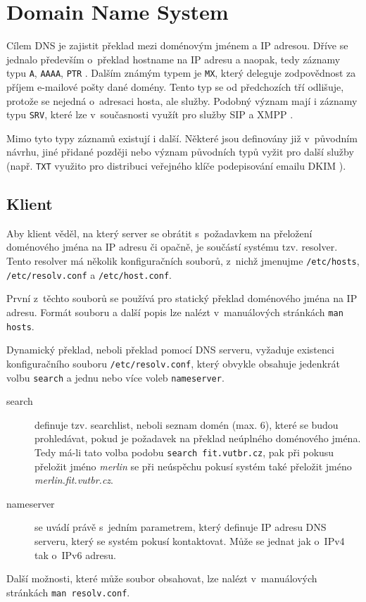 \section{Domain Name System}
\label{dns}
Cílem DNS je zajistit překlad mezi doménovým jménem a IP adresou. Dříve se jednalo především o~překlad hostname na IP adresu a naopak, tedy záznamy typu {\tt A}, {\tt AAAA}, {\tt PTR} \cite{rfc1035,rfc3596}. Dalším známým typem je {\tt MX}, který deleguje zodpovědnost za příjem e-mailové pošty dané domény. Tento typ se od předchozích tří odlišuje, protože se nejedná o~adresaci hosta, ale služby. Podobný význam mají i záznamy typu {\tt SRV}, které lze v~současnosti využít pro služby SIP a XMPP \cite{rfc2782}.

Mimo tyto typy záznamů existují i další. Některé jsou definovány již v~původním návrhu, jiné přidané později nebo význam původních typů vyžit pro další služby (např. {\tt TXT} využito pro distribuci veřejného klíče podepisování emailu DKIM \cite{rfc4871}).

\subsection{Klient}
Aby klient věděl, na který server se obrátit s~požadavkem na přeložení doménového jména na IP adresu či opačně, je součástí systému tzv. resolver. Tento resolver má několik konfiguračních souborů, z~nichž jmenujme {\tt /etc/hosts}, {\tt /etc/resolv.conf} a {\tt /etc/host.conf}.

První z~těchto souborů se používá pro statický překlad doménového jména na IP adresu. Formát souboru a další popis lze nalézt v~manuálových stránkách {\tt man hosts}.

Dynamický překlad, neboli překlad pomocí DNS serveru, vyžaduje existenci konfiguračního souboru {\tt /etc/resolv.conf}, který obvykle obsahuje jedenkrát volbu {\tt search} a jednu nebo více voleb {\tt nameserver}.
\begin{description}
  \item[search] definuje tzv. searchlist, neboli seznam domén (max. 6), které se budou prohledávat, pokud je požadavek na překlad neúplného doménového jména. Tedy má-li tato volba podobu {\tt search fit.vutbr.cz}, pak při pokusu přeložit jméno {\em merlin} se při neúspěchu pokusí systém také přeložit jméno {\em merlin.fit.vutbr.cz}.
  \item[nameserver] se uvádí právě s~jedním parametrem, který definuje IP adresu DNS serveru, který se systém pokusí kontaktovat. Může se jednat jak o~IPv4 tak o~IPv6 adresu.
\end{description}
Další možnosti, které může soubor obsahovat, lze nalézt v~manuálových stránkách {\tt man resolv.conf}.

